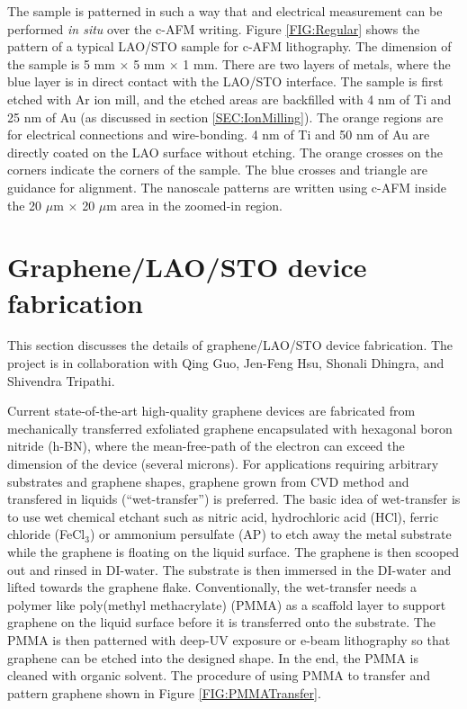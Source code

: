 \documentclass[pdflatex, sectionletters, 12pt, final, phd]{pittetd}    %
\begin{document}
The sample is patterned in such a way that and electrical measurement can be performed \textit{in situ} over the c-AFM writing. Figure \ref{FIG:Regular} shows the pattern of a typical LAO/STO sample for c-AFM lithography. The dimension of the sample is 5 mm $\times$ 5 mm $\times$ 1 mm. There are two layers of metals, where the blue layer is in direct contact with the LAO/STO interface. The sample is first etched with Ar ion mill, and the etched areas are backfilled with 4 nm of Ti and 25 nm of Au (as discussed in section \ref{SEC:IonMilling}). The orange regions are for electrical connections and wire-bonding. 4 nm of Ti and 50 nm of Au are directly coated on the LAO surface without etching. The orange crosses on the corners indicate the corners of the sample. The blue crosses and triangle are guidance for alignment. The nanoscale patterns are written using c-AFM inside the 20 $\mu$m $\times$ 20 $\mu$m area in the zoomed-in region.


\section{Graphene/LAO/STO device fabrication}

This section discusses the details of graphene/LAO/STO device fabrication. The project is in collaboration with Qing Guo, Jen-Feng Hsu, Shonali Dhingra, and Shivendra Tripathi.

Current state-of-the-art high-quality graphene devices are fabricated from mechanically transferred exfoliated graphene encapsulated with hexagonal boron nitride (h-BN)\cite{dean2010naturenano}, where the mean-free-path of the electron can exceed the dimension of the device\cite{Novoselovaac9439} (several microns). For applications requiring arbitrary substrates and graphene shapes, graphene grown from CVD method and transfered in liquids (``wet-transfer'') is preferred. The basic idea of wet-transfer is to use wet chemical etchant such as nitric acid, hydrochloric acid (HCl), ferric chloride (FeCl$_3$) or ammonium persulfate (AP) to etch away the metal substrate while the graphene is floating on the liquid surface. The graphene is then scooped out and rinsed in DI-water. The substrate is then immersed in the DI-water and lifted towards the graphene flake. Conventionally, the wet-transfer needs a polymer like poly(methyl methacrylate) (PMMA) as a scaffold layer to support graphene on the liquid surface before it is transferred onto the substrate\cite{li2009transfer, reina2008transferring, reina2008large}. The PMMA is then patterned with deep-UV exposure or e-beam lithography so that graphene can be etched into the designed shape. In the end, the PMMA is cleaned with organic solvent. The procedure of using PMMA to transfer and pattern graphene shown in Figure \ref{FIG:PMMATransfer}. 
\end{document}
